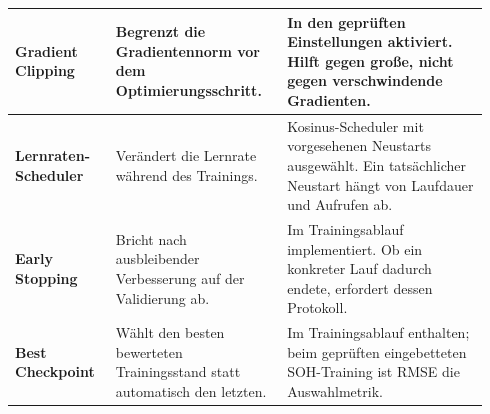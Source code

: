 \begin{longtable}{@{}p{0.20\linewidth}p{0.34\linewidth}p{0.40\linewidth}@{}}
\textbf{Gradient Clipping} & Begrenzt die Gradientennorm vor dem Optimierungsschritt. & In den geprüften Einstellungen aktiviert. Hilft gegen große, nicht gegen verschwindende Gradienten.\\[5pt]\midrule
\textbf{Lernraten-Scheduler} & Verändert die Lernrate während des Trainings. & Kosinus-Scheduler mit vorgesehenen Neustarts ausgewählt. Ein tatsächlicher Neustart hängt von Laufdauer und Aufrufen ab.\\[5pt]\midrule
\textbf{Early Stopping} & Bricht nach ausbleibender Verbesserung auf der Validierung ab. & Im Trainingsablauf implementiert. Ob ein konkreter Lauf dadurch endete, erfordert dessen Protokoll.\\[5pt]\midrule
\textbf{Best Checkpoint} & Wählt den besten bewerteten Trainingsstand statt automatisch den letzten. & Im Trainingsablauf enthalten; beim geprüften eingebetteten SOH-Training ist RMSE die Auswahlmetrik.\\[5pt]\midrule
\end{longtable}\endgroup

